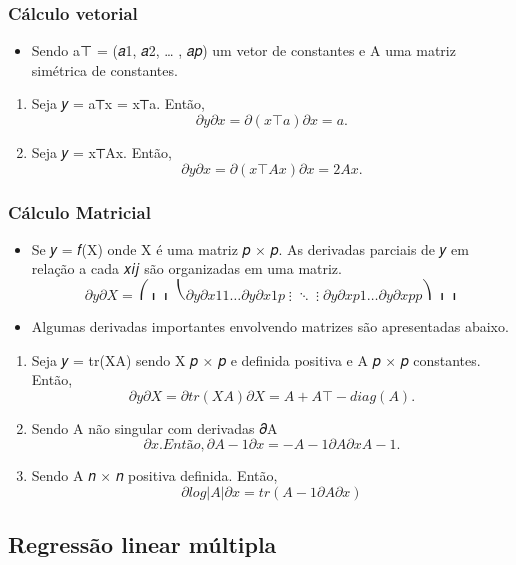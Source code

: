 \documentclass[
]{article}
\providecommand{\tightlist}{%
  \setlength{\itemsep}{0pt}\setlength{\parskip}{0pt}}
\begin{document}
\hypertarget{cuxe1lculo-vetorial-1}{%
\subsubsection{Cálculo vetorial}\label{cuxe1lculo-vetorial-1}}

\begin{itemize}
\tightlist
\item
  Sendo a⊤ = (𝑎1, 𝑎2, \ldots{} , 𝑎𝑝) um vetor de constantes e A uma
  matriz simétrica de constantes.
\end{itemize}

\begin{enumerate}
\def\labelenumi{\arabic{enumi}.}
\tightlist
\item
  Seja 𝑦 = a⊤x = x⊤a. Então, \[
  𝜕𝑦
  𝜕x = 𝜕(x⊤a)
  𝜕x = a.
  \]
\item
  Seja 𝑦 = x⊤Ax. Então, \[
  𝜕𝑦
  𝜕x = 𝜕(x⊤Ax)
  𝜕x = 2Ax.
  \]
\end{enumerate}

\hypertarget{cuxe1lculo-matricial}{%
\subsubsection{Cálculo Matricial}\label{cuxe1lculo-matricial}}

\begin{itemize}
\item
  Se 𝑦 = 𝑓(X) onde X é uma matriz 𝑝 × 𝑝. As derivadas parciais de 𝑦 em
  relação a cada 𝑥𝑖𝑗 são organizadas em uma matriz. \[
  𝜕𝑦
  𝜕X = ⎛⎜⎜
  ⎝
  𝜕𝑦
  𝜕𝑥11
  … 𝜕𝑦
  𝜕𝑥1𝑝
  ⋮ ⋱ ⋮
  𝜕𝑦
  𝜕𝑥𝑝1
  … 𝜕𝑦
  𝜕𝑥𝑝𝑝
  ⎞⎟⎟
  \]
\item
  Algumas derivadas importantes envolvendo matrizes são apresentadas
  abaixo.
\end{itemize}

\begin{enumerate}
\def\labelenumi{\arabic{enumi}.}
\tightlist
\item
  Seja 𝑦 = tr(XA) sendo X 𝑝 × 𝑝 e definida positiva e A 𝑝 × 𝑝
  constantes. Então, \[
  𝜕𝑦
  𝜕X = 𝜕tr(XA)
  𝜕X = A + A⊤ − diag(A).
  \]
\item
  Sendo A não singular com derivadas 𝜕A \[
  𝜕𝑥 . Então,
  𝜕A−1
  𝜕𝑥 = −A−1 𝜕A
  𝜕𝑥 A−1.
  \]
\item
  Sendo A 𝑛 × 𝑛 positiva definida. Então, \[
  𝜕 log |A|
  𝜕𝑥 = tr (A−1 𝜕A
  𝜕𝑥 )
  \]
\end{enumerate}

\hypertarget{regressuxe3o-linear-muxfaltipla}{%
\subsection{Regressão linear
múltipla}\label{regressuxe3o-linear-muxfaltipla}}
\end{document}
